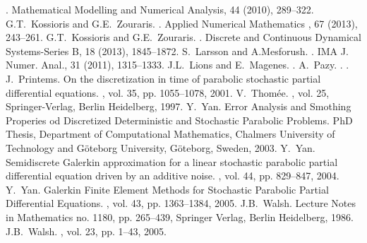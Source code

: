 \documentclass[10pt]{amsart}
\numberwithin{equation}{section}
\begin{document}
\begin{thebibliography}{10}
.
\newblock
{Mathematical Modelling and Numerical Analysis, 44 (2010), 289--322.}
G.T.~Kossioris and G.E.~Zouraris.
.
\newblock
{Applied Numerical Mathematics , 67 (2013), 243--261.}
G.T.~Kossioris and G.E.~Zouraris.
.
\newblock
{Discrete and Continuous Dynamical Systems-Series B, 18 (2013), 1845--1872.}
S.~Larsson and A.Mesforush.
.
\newblock
{IMA J. Numer. Anal., 31 (2011), 1315--1333.}
J.L.~Lions and E.~Magenes.
.
A.~Pazy.
.
.
J.~Printems.
\newblock
On the discretization in time of parabolic stochastic partial
differential equations.
,
vol. 35, pp. 1055--1078, 2001.
V.~Thom{\'e}e.
,
 vol. 25,
\newblock Springer-Verlag, Berlin Heidelberg, 1997.
Y.~Yan.
\newblock Error Analysis and Smothing Properies od Discretized Deterministic
and Stochastic Parabolic Problems.
\newblock PhD Thesis,
\newblock Department of Computational Mathematics,
Chalmers University of Technology and G{\"o}teborg University,
\newblock G{\"o}teborg, Sweden, 2003.
Y.~Yan.
\newblock Semidiscrete Galerkin approximation for a linear stochastic parabolic
partial differential equation driven by an additive noise.
,
vol. 44, pp. 829--847, 2004.
Y.~Yan.
\newblock Galerkin Finite Element Methods for Stochastic
Parabolic Partial Differential Equations.
,
vol. 43, pp. 1363--1384, 2005.
J.B.~Walsh.
\newblock
{Lecture Notes in Mathematics no. 1180,
pp. 265--439, Springer Verlag,
Berlin Heidelberg, 1986.}
J.B.~Walsh.
,
vol. 23, pp. 1--43, 2005.
\end{thebibliography}
\end{document}
